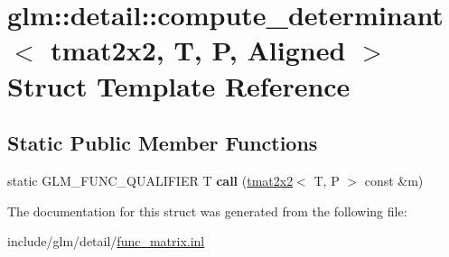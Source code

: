 \hypertarget{structglm_1_1detail_1_1compute__determinant_3_01tmat2x2_00_01T_00_01P_00_01Aligned_01_4}{}\section{glm\+:\+:detail\+:\+:compute\+\_\+determinant$<$ tmat2x2, T, P, Aligned $>$ Struct Template Reference}
\label{structglm_1_1detail_1_1compute__determinant_3_01tmat2x2_00_01T_00_01P_00_01Aligned_01_4}
\subsection*{Static Public Member Functions}
\begin{DoxyCompactItemize}
\item 
\mbox{\label{structglm_1_1detail_1_1compute__determinant_3_01tmat2x2_00_01T_00_01P_00_01Aligned_01_4_a0d29b5bdcb38f4edfc455d097a30c416}} 
static G\+L\+M\+\_\+\+F\+U\+N\+C\+\_\+\+Q\+U\+A\+L\+I\+F\+I\+ER T {\bfseries call} (\hyperlink{structglm_1_1tmat2x2}{tmat2x2}$<$ T, P $>$ const \&m)
\end{DoxyCompactItemize}


The documentation for this struct was generated from the following file\+:\begin{DoxyCompactItemize}
\item 
include/glm/detail/\hyperlink{func__matrix_8inl}{func\+\_\+matrix.\+inl}\end{DoxyCompactItemize}
